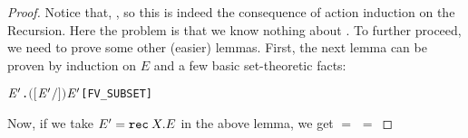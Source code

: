 \begin{proof}
\begin{alltt}
\end{alltt}
Notice that, , so
this is indeed the consequence of action induction on the Recursion.
Here the problem is that we know nothing about
. To further proceed, we need to prove
some other (easier) lemmas. First, the next lemma can be  proven
by  induction on $E$ and a few basic set-theoretic facts:
\begin{alltt}
\HOLTokenTurnstile{} \HOLSymConst{\HOLTokenForall{}}  \ensuremath{\HOLBoundVar{E}\sp{\prime}}.  \ensuremath{(}\ensuremath{[}\ensuremath{\HOLBoundVar{E}\sp{\prime}}\ensuremath{/}\ensuremath{]} \ensuremath{)} \HOLSymConst{\HOLTokenSubset{}}   \HOLSymConst{\HOLTokenUnion{}}  \ensuremath{\HOLBoundVar{E}\sp{\prime}}\hfill{[FV_SUBSET]}
\end{alltt}
Now, if we take $E' = {\tt rec}\: X . E$ in the above lemma, we get
 $=$  $=$

\end{proof}
